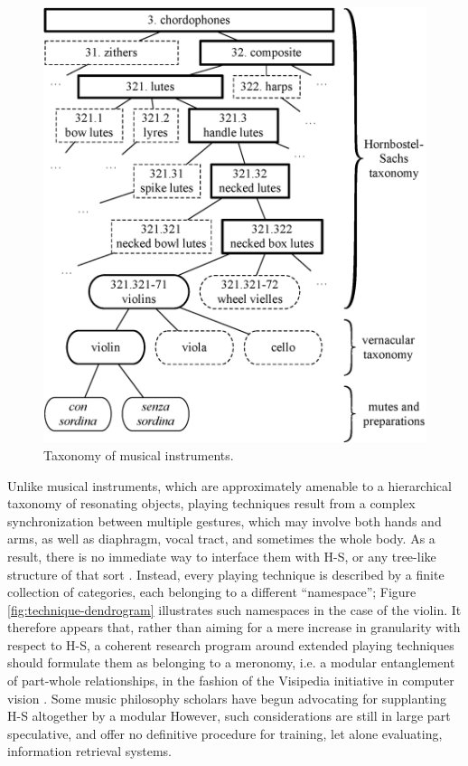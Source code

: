 \documentclass{article}
\makeatletter
\newcommand*{\ie}{i.e.\@\xspace}
\makeatother
\begin{document}
\begin{figure}[t!]
\centering
\includegraphics[width=\linewidth]{./figs/dendrograms/instrument-dendrogram.eps}
\caption{Taxonomy of musical instruments.}
\label{fig:instrument-dendrogram}
\end{figure}

Unlike musical instruments, which are approximately amenable to a hierarchical taxonomy of resonating objects, playing techniques result from a complex synchronization between multiple gestures, which may involve both hands and arms, as well as diaphragm, vocal tract, and sometimes the whole body.
As a result, there is no immediate way to interface them with H-S, or any tree-like structure of that sort \cite{kolozali2011ismir}.
Instead, every playing technique is described by a finite collection of categories, each belonging to a different ``namespace''; Figure \ref{fig:technique-dendrogram} illustrates such namespaces in the case of the violin.
It therefore appears that, rather than aiming for a mere increase in granularity with respect to H-S, a coherent research program around extended playing techniques should formulate them as belonging to a meronomy, \ie{} a modular entanglement of part-whole relationships, in the fashion of the Visipedia initiative in computer vision \cite{belongie2015pattern}.
Some music philosophy scholars have begun advocating for supplanting H-S altogether by a modular \cite{magnusson2017jnmr}
However, such considerations are still in large part speculative, and offer no definitive procedure for training, let alone evaluating, information retrieval systems.
\end{document}
